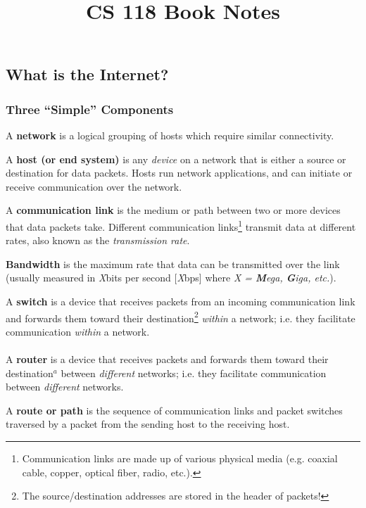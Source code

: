 \documentclass{report}
\title{CS 118 Book Notes}
\date{}
\newcommand{\definition}[2]{\begin{tcolorbox}[title={Definition: #1}]{#2}\end{tcolorbox}}
\begin{document}
\maketitle

\tableofcontents
\newpage


\chapter{}
\section{What is the Internet?}

\subsection{Three ``Simple'' Components}
\definition{Network}{A \textbf{network} is a logical grouping of hosts which require
  similar connectivity.}

\definition{Host/End System}{A \textbf{host (or end system)} is any \textit{device} on a network
  that is either a source or destination for data packets. Hosts run network applications, and can
  initiate or receive communication over the network.}

\definition{Communication Link}{A \textbf{communication link} is the medium or path between two or
  more devices that data packets take. Different communication links\footnote{Communication links are
    made up of various physical media (e.g. coaxial cable, copper, optical fiber, radio, etc.).}
  transmit data at different rates, also known as the \textit{transmission rate}.

\definition{Bandwidth}{\textbf{Bandwidth} is the maximum rate that data
  can be transmitted over the link (usually measured in \textit{X}bits per second [\textit{X}bps]
  where \textit{X = \textbf{M}ega, \textbf{G}iga, etc.}).}}

\definition{Switch and Router}{A \textbf{switch} is a device that
  receives packets from an incoming communication link and forwards them toward their
  destination\footnote{The source/destination addresses are stored in the header of packets!}
  \textit{within} a network; i.e. they facilitate communication \textit{within} a network. \\ \\
  A \textbf{router} is a device that receives packets and forwards them toward their
  destination$^{\textit{a}}$ between \textit{different} networks; i.e. they facilitate communication
  between \textit{different} networks.

\definition{Route/Path}{A \textbf{route or path} is the sequence of communication links and packet
  switches traversed by a packet from the sending host to the receiving host.}}
\end{document}
